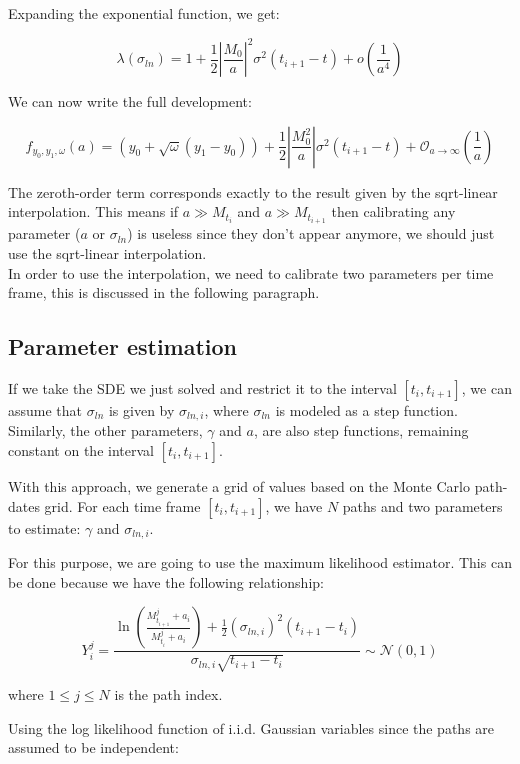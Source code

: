 \documentclass{article}
\begin{document}
Expanding the exponential function, we get:

$$
\lambda(\sigma_{ln}) = 1 + \frac{1}{2} \left|\frac{M_0}{a}\right|^2 \sigma^2 (t_{i+1} - t) + o\left(\frac{1}{a^4}\right)
$$

We can now write the full development:

$$
f_{y_0, y_1, \omega}(a) = (y_0 + \sqrt{\omega}(y_1 - y_0)) + \frac{1}{2} \left|\frac{M_0^2}{a}\right| \sigma^2 (t_{i+1} - t) + \mathcal{O}_{a \to \infty}\left(\frac{1}{a}\right)
$$

The zeroth-order term corresponds exactly to the result given by the sqrt-linear interpolation. This means if $a \gg M_{t_i}$ and $a \gg M_{t_{i+1}}$ then calibrating any parameter ($a$ or $\sigma_{ln}$) is useless since they don't appear anymore, we should just use the sqrt-linear interpolation.\\

In order to use the interpolation, we need to calibrate two parameters per time frame, this is discussed in the following paragraph.

\subsection*{Parameter estimation}

If we take the SDE we just solved and restrict it to the interval \([t_i, t_{i+1}]\), we can assume that \(\sigma_{ln}\) is given by \(\sigma_{ln,i}\), where \(\sigma_{ln}\) is modeled as a step function. Similarly, the other parameters, \(\gamma\) and \(a\), are also step functions, remaining constant on the interval \([t_i, t_{i+1}]\).

With this approach, we generate a grid of values based on the Monte Carlo path-dates grid. For each time frame \([t_i, t_{i+1}]\), we have \(N\) paths and two parameters to estimate: \(\gamma\) and \(\sigma_{ln,i}\).

For this purpose, we are going to use the maximum likelihood estimator. This can be done because we have the following relationship:

\[
Y_i^j = \frac{\ln\left(\frac{M^j_{t_{i+1}} + a_i}{M^j_{t_i} + a_i}\right) + \frac{1}{2} (\sigma_{ln,i})^2 (t_{i+1} - t_i)}{\sigma_{ln, i} \sqrt{t_{i+1} - t_i}} \sim \mathcal{N}(0, 1)
\]

where \(1 \leq j \leq N\) is the path index.

Using the log likelihood function of i.i.d. Gaussian variables since the paths are assumed to be independent:
\end{document}
